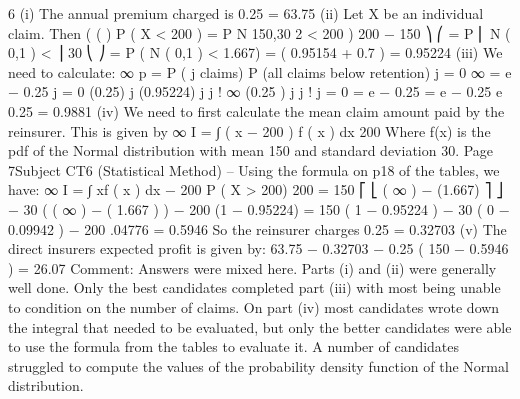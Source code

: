 \documentclass[a4paper,12pt]{article}
\begin{document}
6
(i) The annual premium charged is 0.25   = 63.75
(ii) Let X be an individual claim. Then
( (
)
P ( X < 200 ) = P N 150,30 2 < 200
)
200 − 150 ⎞
⎛
= P ⎜ N ( 0,1 ) <
⎟
30
⎝
⎠
= P ( N ( 0,1 ) < 1.667)
= ( 0.95154  + 0.7  )
= 0.95224
(iii)
We need to calculate:
∞
p = \sum  P ( j claims) \times  P (all claims below retention) 
j = 0
∞
= \sum  e
− 0.25
j = 0
(0.25) j
\times  (0.95224) j
j !
∞
(0.25 ) j
j !
j = 0
= e − 0.25 \times  \sum 
= e − 0.25 \times  e 0.25 
= 0.9881
(iv)
We need to first calculate the mean claim amount paid by the reinsurer. This
is given by
∞
I =
∫ ( x − 200 ) f ( x ) dx
200
Where f(x) is the pdf of the Normal distribution with mean 150 and standard
deviation 30.
Page 7Subject CT6 (Statistical Method) – %
Using the formula on p18 of the tables, we have:
∞
I =
∫ xf ( x ) dx − 200 P ( X > 200)
200
= 150 \times  ⎡ ⎣ \Phi ( ∞ ) − \Phi(1.667) ⎤ ⎦ − 30 \times  ( \Phi ( ∞ ) − \Phi ( 1.667 ) ) − 200 \times  (1 − 0.95224)
= 150 ( 1 − 0.95224 ) − 30 \times  ( 0 − 0.09942 ) − 200 .04776
= 0.5946
So the reinsurer charges 0.25   = 0.32703
(v)
The direct insurers expected profit is given by:
63.75 − 0.32703 − 0.25 \times  ( 150 − 0.5946 ) = 26.07
Comment: Answers were mixed here. Parts (i) and (ii) were generally well done. Only the
best candidates completed part (iii) with most being unable to condition on the number of
claims. On part (iv) most candidates wrote down the integral that needed to be evaluated,
but only the better candidates were able to use the formula from the tables to evaluate it. A
number of candidates struggled to compute the values of the probability density function of
the Normal distribution.
\end{document}
